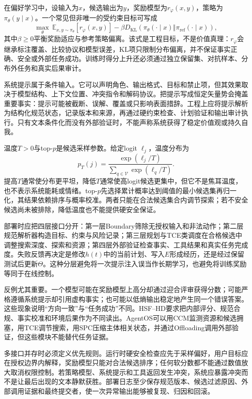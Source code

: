 在偏好学习中，设输入为$x$，候选输出为$y$，奖励模型为$r_\varphi(x,y)$，策略为$\pi_\theta(y\mid x)$。一个常见但非唯一的受约束目标可写成
\[
\max_\theta\ \mathbb E_{x,y\sim\pi_\theta}[r_\varphi(x,y)]
-\beta D_{\mathrm{KL}}(\pi_\theta(\cdot\mid x)\Vert
\pi_{\mathrm{ref}}(\cdot\mid x)),
\]
其中$\beta\ge0$平衡奖励适应与参考策略偏离。该式是工程目标，不是价值真理：$r_\varphi$会继承标注覆盖、比较协议和模型误差，KL项只限制分布偏离，并不保证事实正确、安全或外部任务成功。训练时得分上升还必须通过独立保留集、对抗样本、分布外任务和真实后果审计。

系统提示属于条件输入。它可以声明角色、输出格式、目标和禁止项，但其效果取决于模型结构、上下文位置、冲突指令和解码协议。把提示写成恒定矢量势会掩盖重要事实：提示可能被截断、误解、覆盖或只影响表面措辞。工程上应将提示解析为结构化规范状态，记录版本和来源，再通过硬约束检查、计划验证和输出审计执行。只有文本条件化而没有外部验证时，不能声称系统获得了稳定价值观或持久自我。

温度$T>0$与top-$p$是候选采样参数。给定logit $\ell_j$，温度分布为
\[
p_T(j)=\frac{\exp(\ell_j/T)}{\sum_{q\in\mathcal V}\exp(\ell_q/T)}.
\]
提高$T$通常使分布更平坦，降低$T$通常使高logit候选更集中，但它不是焦耳温度，也不表示系统能耗或情绪。top-$p$先选择累计概率达到阈值的最小候选集再归一化，其结果依赖排序与概率校准。两者只能在合法候选集合内调节探索；若不安全候选尚未被排除，降低温度也不能提供硬安全保证。

部署时应把四层接口分开：第一层Boundary筛除无授权输入和非法动作；第二层规范解析器构造目标、约束与风险记录；第三层规划与TCE类调度在合格候选中调整搜索深度、探索和资源；第四层外部验证检查事实、工具结果和真实任务完成度。失败反馈再决定是修改$h(t)$中的当前计划、写入$E$形成经历，还是经过保留测试后更新$\Theta$。这种分层避免将一次提示注入误当作长期学习，也避免将训练奖励等同于在线控制。

反例尤其重要。一个模型可能在奖励模型上高分却通过迎合评审获得分数；可能严格遵循系统提示却引用虚构事实；也可能以低熵输出稳定地产生同一个错误答案。这些现象说明“方向一致”与“任务成功”不同。HSF--HD要求把内部评分、规范合规、事实校准和环境后果作为不同读出。AgentOS可以用CCM监测资源和候选拥塞，用TCE调节搜索，用SPC压缩主体相关状态，并通过Offloading调用外部验证，但这些模块不能替代任务证据。

多接口并存时必须定义优先规则。运行时硬安全检查应先于采样偏好，用户目标应在授权边界内解释，奖励模型只能对合法候选排序；任何软分数都不能通过数值放大取消权限控制。若策略模型、系统提示和工具返回发生冲突，系统应暴露冲突而不是让最后出现的文本静默获胜。部署日志至少保存规范版本、候选过滤原因、外部调用证据和最终提交者，使一次异常输出能够被复现、归因和回滚。

